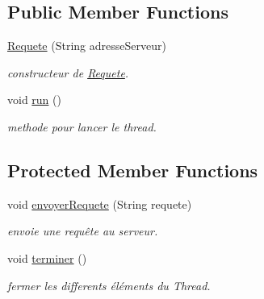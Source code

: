 \subsection*{Public Member Functions}
\begin{DoxyCompactItemize}
\item 
\hyperlink{classrequete_1_1Requete_a6ed8eefb9335b37f2348f5c323a46b53}{Requete} (String adresse\+Serveur)
\begin{DoxyCompactList}\small\item\em constructeur de \hyperlink{classrequete_1_1Requete}{Requete}. \end{DoxyCompactList}\item 
\mbox{\label{classrequete_1_1Requete_a919081397ea25302286d7077e3ece323}} 
void \hyperlink{classrequete_1_1Requete_a919081397ea25302286d7077e3ece323}{run} ()
\begin{DoxyCompactList}\small\item\em methode pour lancer le thread. \end{DoxyCompactList}\end{DoxyCompactItemize}
\subsection*{Protected Member Functions}
\begin{DoxyCompactItemize}
\item 
void \hyperlink{classrequete_1_1Requete_a4adc60edaa26be2f8d9b4e4b0a1377cd}{envoyer\+Requete} (String requete)
\begin{DoxyCompactList}\small\item\em envoie une requête au serveur. \end{DoxyCompactList}\item 
\mbox{\label{classrequete_1_1Requete_a139183d42763866d351b3569c858b169}} 
void \hyperlink{classrequete_1_1Requete_a139183d42763866d351b3569c858b169}{terminer} ()
\begin{DoxyCompactList}\small\item\em fermer les differents éléments du Thread. \end{DoxyCompactList}\end{DoxyCompactItemize}
